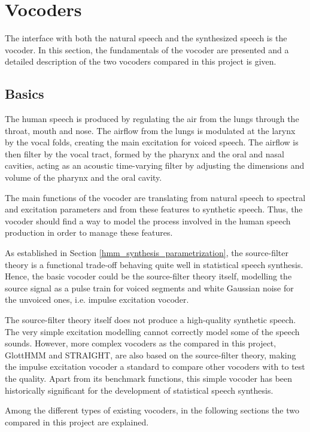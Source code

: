 \section{Vocoders}
\label{vocoders}
The interface with both the natural speech and the synthesized speech is the vocoder. 
%
In this section, the fundamentals of the vocoder are presented and a detailed description of the two vocoders compared in this project is given.

\subsection{Basics}
\label{vocoders_basics}
The human speech is produced by regulating the air from the lungs through the throat, mouth and nose. 
%
The airflow from the lungs is modulated at the larynx by the vocal folds, creating the main excitation for voiced speech. 
%
The airflow is then filter by the vocal tract, formed by the pharynx and the oral and nasal cavities, acting as an acoustic time-varying filter by adjusting the dimensions and volume of the pharynx and the oral cavity.

The main functions of the vocoder are translating from natural speech to spectral and excitation parameters and from these features to synthetic speech.
%
Thus, the vocoder should find a way to model the process involved in the human speech production in order to manage these features.

As established in Section \ref{hmm_synthesis_parametrization}, the source-filter theory is a functional trade-off behaving quite well in statistical speech synthesis.
%
Hence, the basic vocoder could be the source-filter theory itself, modelling the source signal as a pulse train for voiced segments and white Gaussian noise for the unvoiced ones, i.e. impulse excitation vocoder.

The source-filter theory itself does not produce a high-quality synthetic speech.
%
The very simple excitation modelling cannot correctly model some of the speech sounds.
%
However, more complex vocoders as the compared in this project, GlottHMM and STRAIGHT, are also based on the source-filter theory, making the impulse excitation vocoder a standard to compare other vocoders with to test the quality.
%
Apart from its benchmark functions, this simple vocoder has been historically significant for the development of statistical speech synthesis.

Among the different types of existing vocoders, in the following sections the two compared in this project are explained.

